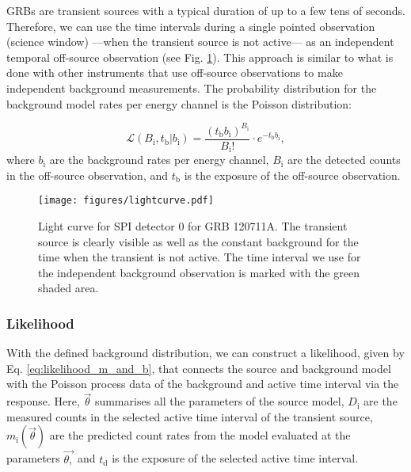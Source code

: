 \documentclass{aa}
\begin{document}
GRBs are transient sources with a typical duration of up to a few tens of seconds. Therefore, we can use the time intervals during a single pointed observation (science window) ---when the transient source is not active--- as an independent temporal off-source observation (see Fig. \ref{fig:lightcurve}). This approach is similar to what is done with other instruments that use off-source observations to make independent background measurements.
The probability distribution for the background model rates per energy channel is the Poisson distribution:

\begin{equation}
        \mathcal{L}(B_{\mathrm{i}}, t_{\mathrm{b}}|b_{\mathrm{i}})=\frac{(t_{\mathrm{b}} b_{\mathrm{i}})^{B_{\mathrm{i}}}}{B_{\mathrm{i}}!}\cdot e^{-t_{\mathrm{b}} b_{\mathrm{i}}},
  \label{eq:poisson_bkg}
\end{equation}
where $b_{\mathrm{i}}$ are the background rates per energy channel, $B_{\mathrm{i}}$ are the detected counts in the off-source observation, and $t_{\mathrm{b}}$ is the exposure of the off-source observation.


\begin{figure}
    \begin{centering}
        \texttt{[image: figures/lightcurve.pdf]}
        \caption{Light curve for SPI detector 0 for GRB 120711A. The transient source is clearly visible as well as the constant background for the time when the transient is not active. The time interval we use for the independent background observation is marked with the green shaded area.}
        \label{fig:lightcurve}
    \end{centering}
\end{figure}


\subsubsection{Likelihood}

With the defined background distribution, we can construct a likelihood, given by Eq. \ref{eq:likelihood_m_and_b}, that connects the source and background model with the Poisson process data of the background and active time interval via the response. Here, $\vec{\theta}$ summarises all the parameters of the source model, $D_{\mathrm{i}}$ are the measured counts in the selected active time interval of the transient source, $m_{\mathrm{i}}(\vec{\theta})$ are the predicted count rates from the model evaluated at the parameters $\vec{\theta,}$ and $t_{\mathrm{d}}$ is the exposure of the selected active time interval.
\end{document}
